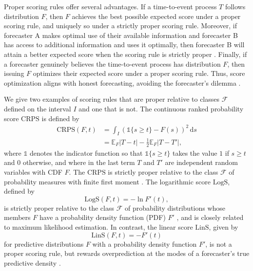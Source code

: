 \documentclass[10pt]{article} %
\theoremstyle{theorem}
\theoremstyle{definition}
\newcommand{\EEE}{\mathbb{E}}
\newcommand{\dd}{\mathrm{d}}
\newcommand{\one}{\mathds{1}}
\newcommand{\CRPS}{\mathrm{CRPS}}
\newcommand{\LogS}{\mathrm{LogS}}
\newcommand{\LinS}{\mathrm{LinS}}
\begin{document}
Proper scoring rules offer several advantages. If a time-to-event process $T$ follows distribution $F$, then $F$ achieves the best possible expected score under a proper scoring rule, and uniquely so under a strictly proper scoring rule. Moreover, if forecaster A makes optimal use of their available information and forecaster B has access to additional information and uses it optimally, then forecaster B will attain a better expected score when the scoring rule is strictly proper \citep{holzmann2014role}. Finally, if a forecaster genuinely believes the time-to-event process has distribution $F$, then issuing $F$ optimizes their expected score under a proper scoring rule. Thus, score optimization aligns with honest forecasting, avoiding the forecaster’s dilemma \citep{lerch2017forecaster}.


We give two examples of scoring rules that are proper relative to classes $\mathcal{F}$ defined on the interval $I$ and one that is not. The continuous ranked probability score $\CRPS$ is defined by
\begin{align}
\CRPS(F,t) 
&= \int_I \left( \one\{s\geq t\}-F(s)\right)^2\,\dd s \label{eq:CRPS1} \\
&= \EEE_F |T - t| - \tfrac{1}{2} \EEE_F |T - T'| \label{eq:CRPS2},
\end{align}
where $\one$ denotes the indicator function so that $\one\{s\geq t\}$ takes the value $1$ if $s\geq t$ and $0$ otherwise, and where in the last term $T$ and $T'$ are independent random variables with CDF $F$. The $\CRPS$ is strictly proper relative to the class $\mathcal{F}$ of probability measures with finite first moment \citep{matheson1976scoring, gneiting2007strictly}. The logarithmic score $\LogS$, defined by
\begin{equation}\label{eq:LogS}
\LogS(F,t) = -\ln F'(t),
\end{equation}
is strictly proper relative to the class $\mathcal{F}$ of probability distributions whose members $F$ have a probability density function (PDF) $F'$ \citep{good1952rational, gneiting2007strictly}, and is closely related to maximum likelihood estimation. In contrast, the linear score $\LinS$, given by
\[
\LinS(F,t) = -F'(t)
\]
for predictive distributions $F$ with a probability density function $F'$, is not a proper scoring rule, but rewards overprediction at the modes of a forecaster’s true predictive density \citep{winkler1969scoring, gneiting2007strictly}.
\end{document}

